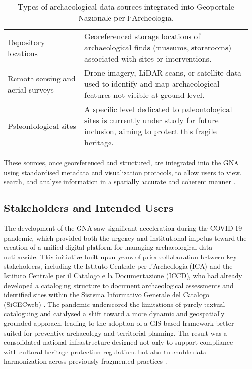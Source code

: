 \begin{spacing}{1.5}
\begin{table}[H]
\begin{tabularx}{\textwidth}{ l >{\justifying\noindent\arraybackslash}p{} }
\cmidrule(lr){1-2}
Depository locations & Georeferenced storage locations of archaeological finds (museums, storerooms) associated with sites or interventions. \\
\cmidrule(lr){1-2}
Remote sensing and aerial surveys & Drone imagery, LiDAR scans, or satellite data used to identify and map archaeological features not visible at ground level. \\
\cmidrule(lr){1-2}
Paleontological sites & A specific level dedicated to paleontological sites is currently under study for future inclusion, aiming to protect this fragile heritage. \\
\bottomrule
\end{tabularx}
\vspace{0.5em}
\caption{Types of archaeological data sources integrated into Geoportale Nazionale per l'Archeologia.}
\label{tab:gna_data_sources}
\end{table}

\noindent These sources, once georeferenced and structured, are integrated into the GNA using standardised metadata and visualization protocols, to allow users to view, search, and analyse information in a spatially accurate and coherent manner \citep{boi_il_2023, acconcia_pubblicazione_2023}.

\subsection{Stakeholders and Intended Users}\label{sec:gna_plugin}
The development of the GNA saw significant acceleration during the COVID-19 pandemic, which provided both the urgency and institutional impetus toward the creation of a unified digital platform for managing archaeological data nationwide. This initiative built upon years of prior collaboration between key stakeholders, including the Istituto Centrale per l’Archeologia (ICA) and the Istituto Centrale per il Catalogo e la Documentazione (ICCD), who had already developed a cataloging structure to document archaeological assessments and identified sites within the Sistema Informativo Generale del Catalogo (SiGECweb) \citep{calandra_il_2023, boi_il_2023}. The pandemic underscored the limitations of purely textual cataloguing and catalysed a shift toward a more dynamic and geospatially grounded approach, leading to the adoption of a GIS-based framework better suited for preventive archaeology and territorial planning. The result was a consolidated national infrastructure designed not only to support compliance with cultural heritage protection regulations but also to enable data harmonization across previously fragmented practices \citep{acconcia_pubblicazione_2023}.


\end{spacing}
